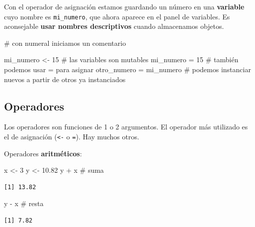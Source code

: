 \documentclass[
  letterpaper,
  DIV=11,
  numbers=noendperiod]{scrartcl}
\newenvironment{Shaded}{\begin{snugshade}}{\end{snugshade}}
\newcommand{\CommentTok}[1]{\textcolor[rgb]{0.37,0.37,0.37}{#1}}
\newcommand{\DecValTok}[1]{\textcolor[rgb]{0.68,0.00,0.00}{#1}}
\newcommand{\FloatTok}[1]{\textcolor[rgb]{0.68,0.00,0.00}{#1}}
\newcommand{\NormalTok}[1]{\textcolor[rgb]{0.00,0.23,0.31}{#1}}
\newcommand{\OtherTok}[1]{\textcolor[rgb]{0.00,0.23,0.31}{#1}}
\newcommand{\SpecialCharTok}[1]{\textcolor[rgb]{0.37,0.37,0.37}{#1}}
\begin{document}
Con el operador de asignación estamos guardando un número en una
\textbf{variable} cuyo nombre es \texttt{mi\_numero}, que ahora aparece
en el panel de variables. Es aconsejable \textbf{usar nombres
descriptivos} cuando almacenamos objetos.

\begin{Shaded}
\begin{Highlighting}[]
\CommentTok{\# con numeral iniciamos un comentario}

\NormalTok{mi\_numero }\OtherTok{\textless{}{-}} \DecValTok{15} \CommentTok{\# las variables son mutables}
\NormalTok{mi\_numero }\OtherTok{=} \DecValTok{15} \CommentTok{\# también podemos usar = para asignar}
\NormalTok{otro\_numero }\OtherTok{=}\NormalTok{ mi\_numero }\CommentTok{\# podemos instanciar nuevos a partir de otros ya instanciados}
\end{Highlighting}
\end{Shaded}

\subsection{Operadores}\label{operadores}

Los operadores son funciones de 1 o 2 argumentos. El operador más
utilizado es el de asignación (\texttt{\textless{}-} o \texttt{=}). Hay
muchos otros.

Operadores \textbf{aritméticos}:

\begin{Shaded}
\begin{Highlighting}[]
\NormalTok{x }\OtherTok{\textless{}{-}} \DecValTok{3} 
\NormalTok{y }\OtherTok{\textless{}{-}} \FloatTok{10.82} 
\NormalTok{y }\SpecialCharTok{+}\NormalTok{ x }\CommentTok{\# suma }
\end{Highlighting}
\end{Shaded}

\begin{verbatim}
[1] 13.82
\end{verbatim}

\begin{Shaded}
\begin{Highlighting}[]
\NormalTok{y }\SpecialCharTok{{-}}\NormalTok{ x }\CommentTok{\# resta }
\end{Highlighting}
\end{Shaded}

\begin{verbatim}
[1] 7.82
\end{verbatim}
\end{document}
